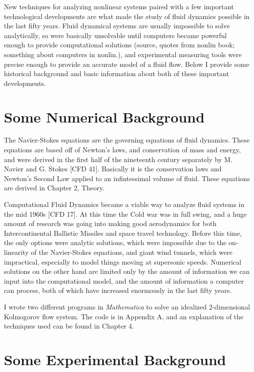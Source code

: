 	New techniques for analyzing nonlinear systems paired with a few important technological developments are what made the study of fluid dynamics possible in the last fifty years.  Fluid dynamical systems are usually impossible to solve analytically, so were basically unsolvable until computers became powerful enough to provide computational solutions (source, quotes from nonlin book; something about computers in nonlin.), and experimental measuring tools were precise enough to provide an accurate model of a fluid flow.  Below I provide some historical background and basic information about both of these important developments.

\section{Some Numerical Background}

	The Navier-Stokes equations are the governing equations of fluid dynamics.  These equations are based off of Newton's laws, and conservation of mass and energy, and were derived in the first half of the nineteenth century separately by M. Navier and G. Stokes [CFD 41].  Basically it is the conservation laws and Newton's Second Law applied to an infintessimal volume of fluid.  These equations are derived in Chapter 2, Theory.
	
	Computational Fluid Dynamics became a viable way to analyze fluid systems in the mid 1960s [CFD 17].  At this time the Cold war was in full swing, and a huge amount of research was going into making good aerodynamics for both Intercontinental Ballistic Missiles and space travel technology.  Before this time, the only options were analytic solutions, which were impossible due to the on-linearity of the Navier-Stokes equations, and giant wind tunnels, which were impractical, especially to model things moving at supersonic speeds.  Numerical solutions on the other hand are limited only by the amount of information we can input into the computational model, and the amount of information a computer can process, both of which have increased enormously in the last fifty years.
	
	I wrote two different programs in \textit{Mathematica} to solve an idealized 2-dimensional Kolmogorov flow system.  The code is in Appendix A, and an explanation of the techniques used can be found in Chapter 4.


\section{Some Experimental Background}
	
